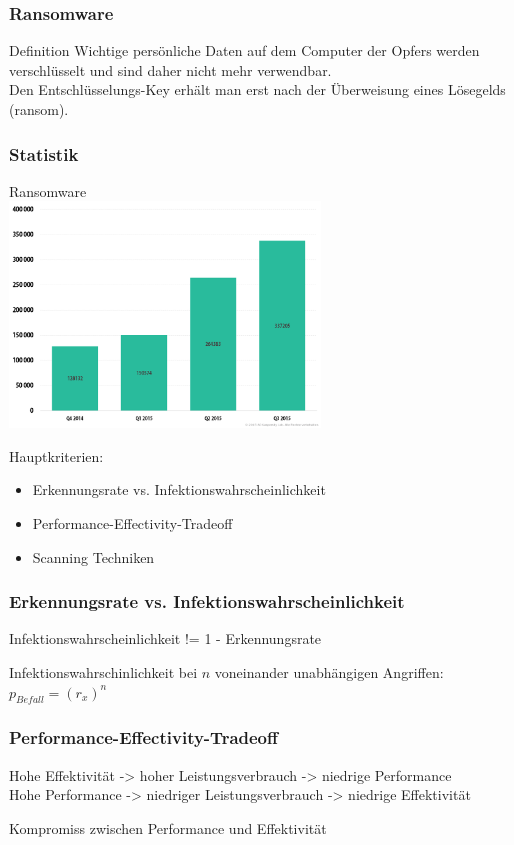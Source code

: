 \documentclass{beamer}
\begin{document}
\begin{frame}
	\frametitle{Ransomware}
	\begin{block}{Definition}
		Wichtige persönliche Daten auf dem Computer der Opfers werden verschlüsselt und sind daher nicht mehr verwendbar.\\
		Den Entschlüsselungs-Key erhält man erst nach der Überweisung eines Lösegelds (ransom).
	\end{block}
\end{frame}
	

\begin{frame}
\frametitle{Statistik}
Ransomware \\
\includegraphics[height=6cm]{bilder/ransom.png}

\end{frame}


\begin{frame}
Hauptkriterien:
\begin{itemize}
	\item Erkennungsrate vs. Infektionswahrscheinlichkeit
	\item Performance-Effectivity-Tradeoff
	\item Scanning Techniken
\end{itemize}
\end{frame}

\begin{frame}
\frametitle{Erkennungsrate vs. Infektionswahrscheinlichkeit}
\begin{block}{}
	Infektionswahrscheinlichkeit != 1 - Erkennungsrate
\end{block}
Infektionswahrschinlichkeit bei $n$ voneinander unabhängigen Angriffen: \\
\centering
$p_{Befall} = (r_x)^n$
\end{frame}

\begin{frame}
\frametitle{Performance-Effectivity-Tradeoff}
Hohe Effektivität -> hoher Leistungsverbrauch -> niedrige Performance\\
Hohe Performance -> niedriger Leistungsverbrauch -> niedrige Effektivität

\begin{block}{}
	Kompromiss zwischen Performance und Effektivität
\end{block}
\end{frame}
\end{document}
